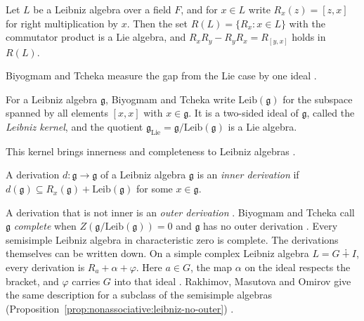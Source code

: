 \begin{proposition}
\label{prop:nonassociative:leibniz-right}
Let $L$ be a Leibniz algebra over a field $F$, and for $x\in L$ write
$R_x(z)=[z,x]$ for right multiplication by $x$. Then the set
$R(L)=\{R_x:x\in L\}$ with the commutator product is a Lie algebra, and
$R_xR_y-R_yR_x=R_{[y,x]}$ holds in $R(L)$.
\end{proposition}

Biyogmam and Tcheka measure the gap from the Lie case by one ideal
\cite[p.~2191]{BiyogmamTcheka2021Outer}.

\begin{definition}
\label{def:nonassociative:leibniz-kernel}
For a Leibniz algebra $\mathfrak{g}$, Biyogmam and Tcheka write
$\mathrm{Leib}(\mathfrak{g})$ for the subspace spanned by all elements
$[x,x]$ with $x\in\mathfrak{g}$. It is a two-sided ideal of
$\mathfrak{g}$, called the \emph{Leibniz kernel}, and the quotient
$\mathfrak{g}_{\mathrm{Lie}}=\mathfrak{g}/\mathrm{Leib}(\mathfrak{g})$
is a Lie algebra.
\end{definition}

This kernel brings innerness and completeness to Leibniz algebras
\cite[Definition~2.4 and Definition~3.3,
p.~2192]{BiyogmamTcheka2021Outer}.

\begin{definition}
\label{def:nonassociative:leibniz-inner}
A derivation $d\colon\mathfrak{g}\to\mathfrak{g}$ of a Leibniz algebra
$\mathfrak{g}$ is an \emph{inner derivation} if
$d(\mathfrak{g})\subseteq R_x(\mathfrak{g})+
\mathrm{Leib}(\mathfrak{g})$ for some $x\in\mathfrak{g}$.
\end{definition}

A derivation that is not inner is an \emph{outer derivation}
\cite[Definition~3.3, p.~2192]{BiyogmamTcheka2021Outer}. Biyogmam and Tcheka
call $\mathfrak{g}$ \emph{complete} when
$Z(\mathfrak{g}/\mathrm{Leib}(\mathfrak{g}))=0$ and $\mathfrak{g}$ has no
outer derivation \cite[Definition~3.3, p.~2192]{BiyogmamTcheka2021Outer}.
Every semisimple Leibniz algebra in characteristic zero is complete. The
derivations themselves can be written down. On a simple complex Leibniz algebra
$L=G\dotplus I$, every derivation is $R_{a}+\alpha+\varphi$. Here $a\in G$,
the map $\alpha$ on the ideal respects the bracket, and $\varphi$ carries $G$
into that ideal \cite[Theorem~3.2]{RakhimovMasutovaOmirov2017}. Rakhimov,
Masutova and Omirov give the same description for a subclass of the semisimple
algebras (Proposition~\ref{prop:nonassociative:leibniz-no-outer}) \cite[Abstract, p.~1]{RakhimovMasutovaOmirov2017}.

